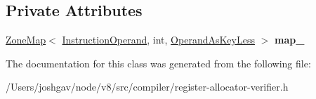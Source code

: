 \subsection*{Private Attributes}
\begin{DoxyCompactItemize}
\item 
\hyperlink{classv8_1_1internal_1_1_zone_map}{Zone\+Map}$<$ \hyperlink{classv8_1_1internal_1_1compiler_1_1_instruction_operand}{Instruction\+Operand}, int, \hyperlink{structv8_1_1internal_1_1compiler_1_1_operand_as_key_less}{Operand\+As\+Key\+Less} $>$ {\bfseries map\+\_\+}\hypertarget{classv8_1_1internal_1_1compiler_1_1_register_allocator_verifier_1_1_delayed_assessments_abf8bbfb25220b56c0029fd804a4e3484}{}\label{classv8_1_1internal_1_1compiler_1_1_register_allocator_verifier_1_1_delayed_assessments_abf8bbfb25220b56c0029fd804a4e3484}

\end{DoxyCompactItemize}


The documentation for this class was generated from the following file\+:\begin{DoxyCompactItemize}
\item 
/\+Users/joshgav/node/v8/src/compiler/register-\/allocator-\/verifier.\+h\end{DoxyCompactItemize}
